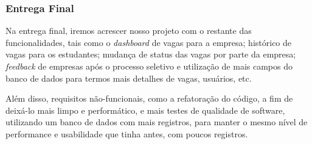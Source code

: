 \subsubsection{Entrega Final}

Na entrega final, iremos acrescer nosso projeto com o restante das funcionalidades, tais como o \emph{dashboard} de vagas para a empresa; histórico de vagas para os estudantes; mudança de status das vagas por parte da empresa; \emph{feedback} de empresas após o processo seletivo e utilização de mais campos do banco de dados para termos mais detalhes de vagas, usuários, etc.

Além disso, requisitos não-funcionais, como a refatoração do código, a fim de deixá-lo mais limpo e performático, e mais testes de qualidade de software, utilizando um banco de dados com mais registros, para manter o mesmo nível de performance e usabilidade que tinha antes, com poucos registros.